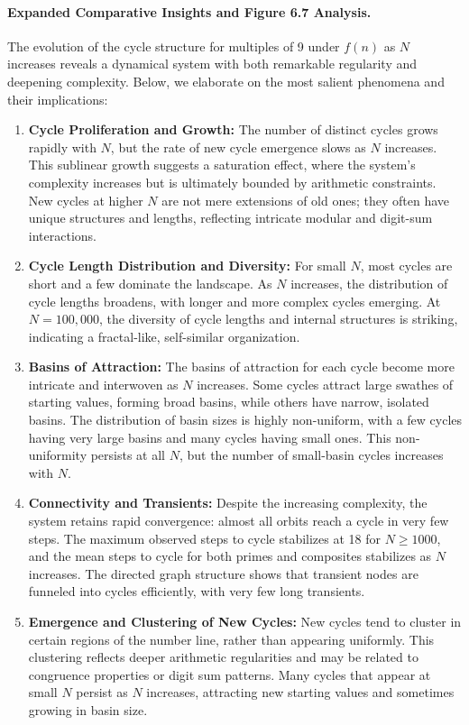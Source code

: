 \documentclass[12pt]{article}
\begin{document}
\paragraph{Expanded Comparative Insights and Figure 6.7 Analysis.}
The evolution of the cycle structure for multiples of 9 under $f(n)$ as $N$ increases reveals a dynamical system with both remarkable regularity and deepening complexity. Below, we elaborate on the most salient phenomena and their implications:

\begin{enumerate}
    \item \textbf{Cycle Proliferation and Growth:} The number of distinct cycles grows rapidly with $N$, but the rate of new cycle emergence slows as $N$ increases. This sublinear growth suggests a saturation effect, where the system's complexity increases but is ultimately bounded by arithmetic constraints. New cycles at higher $N$ are not mere extensions of old ones; they often have unique structures and lengths, reflecting intricate modular and digit-sum interactions.
    \item \textbf{Cycle Length Distribution and Diversity:} For small $N$, most cycles are short and a few dominate the landscape. As $N$ increases, the distribution of cycle lengths broadens, with longer and more complex cycles emerging. At $N=100,000$, the diversity of cycle lengths and internal structures is striking, indicating a fractal-like, self-similar organization.
    \item \textbf{Basins of Attraction:} The basins of attraction for each cycle become more intricate and interwoven as $N$ increases. Some cycles attract large swathes of starting values, forming broad basins, while others have narrow, isolated basins. The distribution of basin sizes is highly non-uniform, with a few cycles having very large basins and many cycles having small ones. This non-uniformity persists at all $N$, but the number of small-basin cycles increases with $N$.
    \item \textbf{Connectivity and Transients:} Despite the increasing complexity, the system retains rapid convergence: almost all orbits reach a cycle in very few steps. The maximum observed steps to cycle stabilizes at 18 for $N \geq 1000$, and the mean steps to cycle for both primes and composites stabilizes as $N$ increases. The directed graph structure shows that transient nodes are funneled into cycles efficiently, with very few long transients.
    \item \textbf{Emergence and Clustering of New Cycles:} New cycles tend to cluster in certain regions of the number line, rather than appearing uniformly. This clustering reflects deeper arithmetic regularities and may be related to congruence properties or digit sum patterns. Many cycles that appear at small $N$ persist as $N$ increases, attracting new starting values and sometimes growing in basin size.

\end{enumerate}
\end{document}
